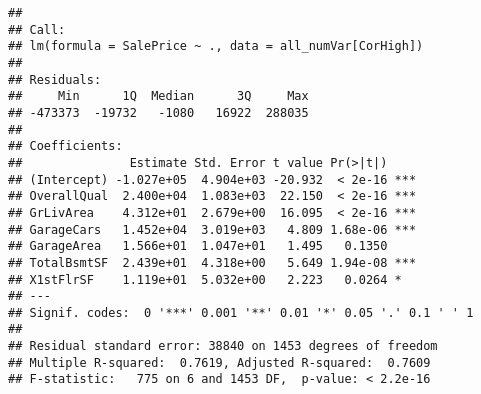 \documentclass[]{article}
\begin{document}
\begin{verbatim}
## 
## Call:
## lm(formula = SalePrice ~ ., data = all_numVar[CorHigh])
## 
## Residuals:
##     Min      1Q  Median      3Q     Max 
## -473373  -19732   -1080   16922  288035 
## 
## Coefficients:
##               Estimate Std. Error t value Pr(>|t|)    
## (Intercept) -1.027e+05  4.904e+03 -20.932  < 2e-16 ***
## OverallQual  2.400e+04  1.083e+03  22.150  < 2e-16 ***
## GrLivArea    4.312e+01  2.679e+00  16.095  < 2e-16 ***
## GarageCars   1.452e+04  3.019e+03   4.809 1.68e-06 ***
## GarageArea   1.566e+01  1.047e+01   1.495   0.1350    
## TotalBsmtSF  2.439e+01  4.318e+00   5.649 1.94e-08 ***
## X1stFlrSF    1.119e+01  5.032e+00   2.223   0.0264 *  
## ---
## Signif. codes:  0 '***' 0.001 '**' 0.01 '*' 0.05 '.' 0.1 ' ' 1
## 
## Residual standard error: 38840 on 1453 degrees of freedom
## Multiple R-squared:  0.7619, Adjusted R-squared:  0.7609 
## F-statistic:   775 on 6 and 1453 DF,  p-value: < 2.2e-16
\end{verbatim}
\end{document}
